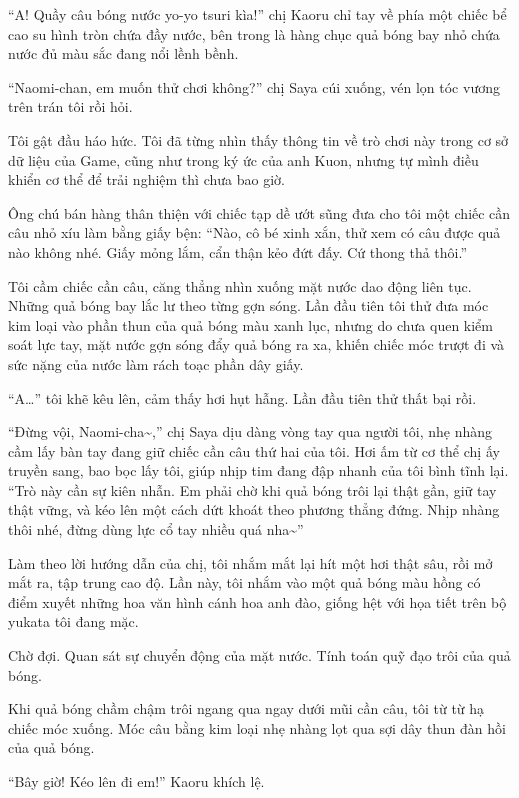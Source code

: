 \documentclass[../main.tex]{subfiles}
\begin{document}
``A! Quầy câu bóng nước yo-yo tsuri kìa!'' chị Kaoru chỉ tay về phía một chiếc bể cao su hình tròn chứa đầy nước, bên trong là hàng chục quả bóng bay nhỏ chứa nước đủ màu sắc đang nổi lềnh bềnh.

``Naomi-chan, em muốn thử chơi không?'' chị Saya cúi xuống, vén lọn tóc vương trên trán tôi rồi hỏi.

Tôi gật đầu háo hức. Tôi đã từng nhìn thấy thông tin về trò chơi này trong cơ sở dữ liệu của Game, cũng như trong ký ức của anh Kuon, nhưng tự mình điều khiển cơ thể để trải nghiệm thì chưa bao giờ.

Ông chú bán hàng thân thiện với chiếc tạp dề ướt sũng đưa cho tôi một chiếc cần câu nhỏ xíu làm bằng giấy bện: ``Nào, cô bé xinh xắn, thử xem có câu được quả nào không nhé. Giấy mỏng lắm, cẩn thận kẻo đứt đấy. Cứ thong thả thôi.''

Tôi cầm chiếc cần câu, căng thẳng nhìn xuống mặt nước dao động liên tục. Những quả bóng bay lắc lư theo từng gợn sóng. Lần đầu tiên tôi thử đưa móc kim loại vào phần thun của quả bóng màu xanh lục, nhưng do chưa quen kiểm soát lực tay, mặt nước gợn sóng đẩy quả bóng ra xa, khiến chiếc móc trượt đi và sức nặng của nước làm rách toạc phần dây giấy.

``A\dots'' tôi khẽ kêu lên, cảm thấy hơi hụt hẫng. Lần đầu tiên thử thất bại rồi.

``Đừng vội, Naomi-cha\~{},'' chị Saya dịu dàng vòng tay qua người tôi, nhẹ nhàng cầm lấy bàn tay đang giữ chiếc cần câu thứ hai của tôi. Hơi ấm từ cơ thể chị ấy truyền sang, bao bọc lấy tôi, giúp nhịp tim đang đập nhanh của tôi bình tĩnh lại. ``Trò này cần sự kiên nhẫn. Em phải chờ khi quả bóng trôi lại thật gần, giữ tay thật vững, và kéo lên một cách dứt khoát theo phương thẳng đứng. Nhịp nhàng thôi nhé, đừng dùng lực cổ tay nhiều quá nha\~{}''

Làm theo lời hướng dẫn của chị, tôi nhắm mắt lại hít một hơi thật sâu, rồi mở mắt ra, tập trung cao độ. Lần này, tôi nhắm vào một quả bóng màu hồng có điểm xuyết những hoa văn hình cánh hoa anh đào, giống hệt với họa tiết trên bộ yukata tôi đang mặc.

Chờ đợi. Quan sát sự chuyển động của mặt nước. Tính toán quỹ đạo trôi của quả bóng.

Khi quả bóng chầm chậm trôi ngang qua ngay dưới mũi cần câu, tôi từ từ hạ chiếc móc xuống. Móc câu bằng kim loại nhẹ nhàng lọt qua sợi dây thun đàn hồi của quả bóng.

``Bây giờ! Kéo lên đi em!'' Kaoru khích lệ.
\end{document}
